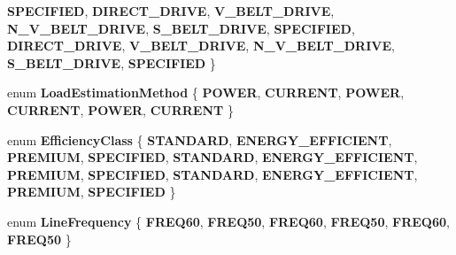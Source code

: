\begin{DoxyCompactItemize}
{\bfseries S\+P\+E\+C\+I\+F\+I\+ED}, 
{\bfseries D\+I\+R\+E\+C\+T\+\_\+\+D\+R\+I\+VE}, 
{\bfseries V\+\_\+\+B\+E\+L\+T\+\_\+\+D\+R\+I\+VE}, 
{\bfseries N\+\_\+\+V\+\_\+\+B\+E\+L\+T\+\_\+\+D\+R\+I\+VE}, 
\newline
{\bfseries S\+\_\+\+B\+E\+L\+T\+\_\+\+D\+R\+I\+VE}, 
{\bfseries S\+P\+E\+C\+I\+F\+I\+ED}, 
{\bfseries D\+I\+R\+E\+C\+T\+\_\+\+D\+R\+I\+VE}, 
{\bfseries V\+\_\+\+B\+E\+L\+T\+\_\+\+D\+R\+I\+VE}, 
\newline
{\bfseries N\+\_\+\+V\+\_\+\+B\+E\+L\+T\+\_\+\+D\+R\+I\+VE}, 
{\bfseries S\+\_\+\+B\+E\+L\+T\+\_\+\+D\+R\+I\+VE}, 
{\bfseries S\+P\+E\+C\+I\+F\+I\+ED}
 \}
\item 
\mbox{\label{struct_motor_a6f8326215d659b4e6961510281e4af4b}} 
enum {\bfseries Load\+Estimation\+Method} \{ \newline
{\bfseries P\+O\+W\+ER}, 
{\bfseries C\+U\+R\+R\+E\+NT}, 
{\bfseries P\+O\+W\+ER}, 
{\bfseries C\+U\+R\+R\+E\+NT}, 
\newline
{\bfseries P\+O\+W\+ER}, 
{\bfseries C\+U\+R\+R\+E\+NT}
 \}
\item 
\mbox{\label{struct_motor_afa022971ae062406a9f588c601673d4e}} 
enum {\bfseries Efficiency\+Class} \{ \newline
{\bfseries S\+T\+A\+N\+D\+A\+RD}, 
{\bfseries E\+N\+E\+R\+G\+Y\+\_\+\+E\+F\+F\+I\+C\+I\+E\+NT}, 
{\bfseries P\+R\+E\+M\+I\+UM}, 
{\bfseries S\+P\+E\+C\+I\+F\+I\+ED}, 
\newline
{\bfseries S\+T\+A\+N\+D\+A\+RD}, 
{\bfseries E\+N\+E\+R\+G\+Y\+\_\+\+E\+F\+F\+I\+C\+I\+E\+NT}, 
{\bfseries P\+R\+E\+M\+I\+UM}, 
{\bfseries S\+P\+E\+C\+I\+F\+I\+ED}, 
\newline
{\bfseries S\+T\+A\+N\+D\+A\+RD}, 
{\bfseries E\+N\+E\+R\+G\+Y\+\_\+\+E\+F\+F\+I\+C\+I\+E\+NT}, 
{\bfseries P\+R\+E\+M\+I\+UM}, 
{\bfseries S\+P\+E\+C\+I\+F\+I\+ED}
 \}
\item 
\mbox{\label{struct_motor_acee1bdf1b684ad36cb80dc2829d9fcee}} 
enum {\bfseries Line\+Frequency} \{ \newline
{\bfseries F\+R\+E\+Q60}, 
{\bfseries F\+R\+E\+Q50}, 
{\bfseries F\+R\+E\+Q60}, 
{\bfseries F\+R\+E\+Q50}, 
\newline
{\bfseries F\+R\+E\+Q60}, 
{\bfseries F\+R\+E\+Q50}
 \}
\item 
\mbox{\label{struct_motor_a7ebc378cf0aee50a8d2b99f0e0a53047}} 

\end{DoxyCompactItemize}
